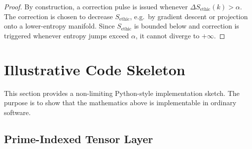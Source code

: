 \documentclass[11pt]{article}
\begin{document}
\begin{proof}
By construction, a correction pulse is issued whenever \(\Delta S_{\mathrm{ethic}}(k) > \alpha\).%
The correction is chosen to decrease \(S_{\mathrm{ethic}}\), e.g.\ by gradient descent or projection onto a lower-entropy manifold.%
Since \(S_{\mathrm{ethic}}\) is bounded below and correction is triggered whenever entropy jumps exceed \(\alpha\), it cannot diverge to \(+\infty\).%
\end{proof}

\section{Illustrative Code Skeleton}
\label{sec:code}

This section provides a non-limiting Python-style implementation sketch.%
The purpose is to show that the mathematics above is implementable in ordinary software.

\subsection{Prime-Indexed Tensor Layer}
\end{document}
